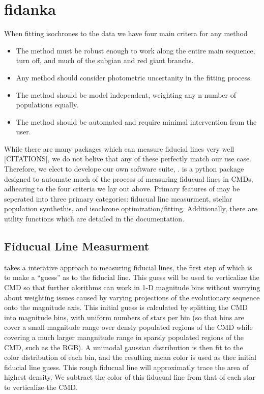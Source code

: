 \section{fidanka}\label{sec:fidanka}
When fitting isochrones to the data we have four main critera for any method

\begin{itemize}
	\item The method must be robust enough to work along the entire main sequence, turn off, and much of the subgian and red giant branchs.
	\item Any method should consider photometric uncertanity in the fitting process.
	\item The method should be model independent, weighting any n number of populations equally.
	\item The method should be automated and require minimal intervention from the user.
\end{itemize}


While there are many packages which can measure fiducial lines very well
{\color{red}[CITATIONS]}, we do not belive that any of these perfectly match
our use case. Therefore, we elect to develope our own software suite, \fidanka.
\fidanka is a python package designed to automate much of the process of
measuring fiducual lines in CMDs, adhearing to the four criteria we lay out
above. Primary features of \fidanka may be seperated into three primary
categories: fiducual line measurment, stellar population synthethis, and
isochrone optimization/fitting. Additionally, there are utility functions which
are detailed in the \fidanka documentation.

\subsection{Fiducual Line Measurment}
\fidanka takes a interative approach to measuring fiducial lines, the first
step of which is to make a ``guess'' as to the fiducial line. This guess will
be used to verticalize the CMD so that further alorithms can work in 1-D
magnitude bins without worrying about weighting issues caused by varying
projections of the evolutionary sequence onto the magnitude axis. This initial
guess is calculated by splitting the CMD into magnitude bins, with uniform
numbers of stars per bin (so that bins are cover a small magnitude range over
densly populated regions of the CMD while covering a much larger mangnitude
range in sparsly populated regions of the CMD, such as the RGB). A unimodal
gaussian distribution is then fit to the color distribution of each bin, and
the resulting mean color is used as thec initial fiducial line guess. This
rough fiducual line will approximatly trace the area of highest density. We
subtract the color of this fiducual line from that of each star to verticalize
the CMD. 

